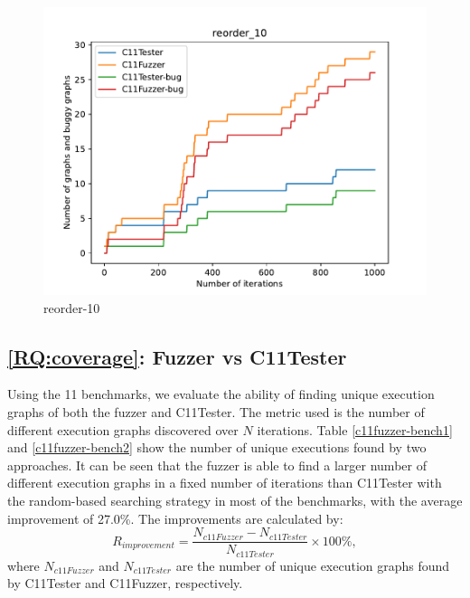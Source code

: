 \begin{figure}[H]
	\begin{minipage}{0.45\textwidth}
		\centering
		\includegraphics[width=\textwidth]{figure/hardbug/reorder_10_bug.pdf}
		\caption{reorder-10}
		\label{hard:reorder-10}
	\end{minipage}
	\hfill
	\begin{minipage}{0.45\textwidth}
		\centering
	\end{minipage}



\end{figure}










\subsection{\ref*{RQ:coverage}: Fuzzer vs C11Tester}

Using the 11 benchmarks, we evaluate the ability of finding unique execution graphs of both the fuzzer and C11Tester. The metric used is the number of different execution graphs discovered over $N$ iterations. Table \ref{c11fuzzer-bench1} and \ref{c11fuzzer-bench2} show the number of unique executions found by two approaches. It can be seen that the fuzzer is able to find a larger number of different execution graphs in a fixed number of iterations than C11Tester with the random-based searching strategy in most of the benchmarks, with the average improvement of 27.0\%. The improvements are calculated by:
\[
	R_{improvement} = \frac{N_{c11Fuzzer} - N_{c11Tester} }{N_{c11Tester} } \times 100 \% ,
\]
where $N_{c11Fuzzer}$ and $N_{c11Tester}$ are the number of unique execution graphs found by C11Tester and C11Fuzzer, respectively.

